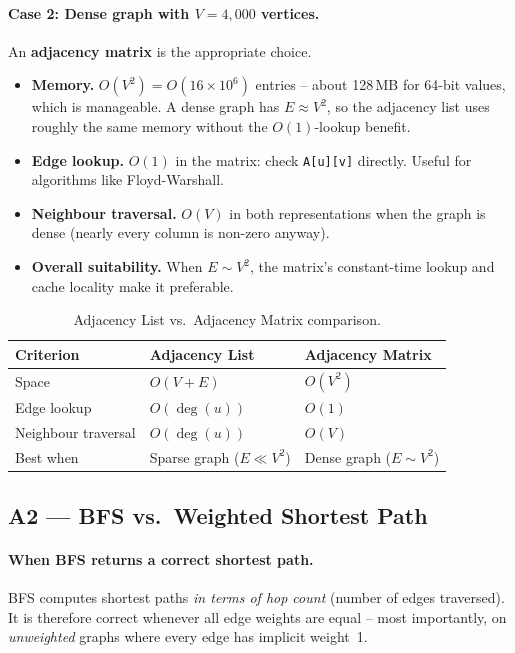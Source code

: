 \documentclass[11pt,a4paper]{article}
\begin{document}
\paragraph{Case 2: Dense graph with $V = 4{,}000$ vertices.}

An \textbf{adjacency matrix} is the appropriate choice.

\begin{itemize}[noitemsep]
  \item \textbf{Memory.} $O(V^2) = O(16 \times 10^6)$ entries -- about 128\,MB for 64-bit values, which is manageable.  A dense graph has $E \approx V^2$, so the adjacency list uses roughly the same memory without the $O(1)$-lookup benefit.
  \item \textbf{Edge lookup.} $O(1)$ in the matrix: check \texttt{A[u][v]} directly. Useful for algorithms like Floyd-Warshall.
  \item \textbf{Neighbour traversal.} $O(V)$ in both representations when the graph is dense (nearly every column is non-zero anyway).
  \item \textbf{Overall suitability.} When $E \sim V^2$, the matrix's constant-time lookup and cache locality make it preferable.
\end{itemize}

\begin{table}[H]
\centering
\caption{Adjacency List vs.\ Adjacency Matrix comparison.}
\begin{tabular}{lll}
\toprule
Criterion & Adjacency List & Adjacency Matrix \\
\midrule
Space & $O(V+E)$ & $O(V^2)$ \\
Edge lookup & $O(\deg(u))$ & $O(1)$ \\
Neighbour traversal & $O(\deg(u))$ & $O(V)$ \\
Best when & Sparse graph ($E \ll V^2$) & Dense graph ($E \sim V^2$) \\
\bottomrule
\end{tabular}
\end{table}

\subsection{A2 --- BFS vs.\ Weighted Shortest Path}

\paragraph{When BFS returns a correct shortest path.}
BFS computes shortest paths \emph{in terms of hop count} (number of edges traversed). It is therefore correct whenever all edge weights are equal -- most importantly, on \emph{unweighted} graphs where every edge has implicit weight~1.
\end{document}
